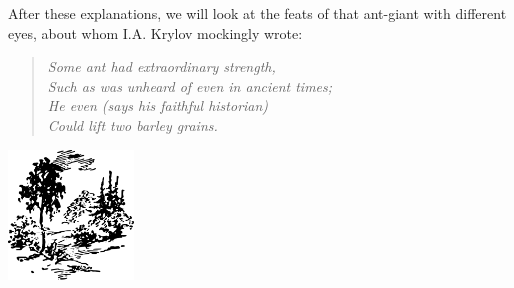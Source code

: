 After these explanations, we will look at the feats of that ant-giant with different eyes, about whom I.A. Krylov mockingly wrote:
\begin{quote}
\emph{Some ant had extraordinary strength,\\
 Such as was unheard of even in ancient times; \\
 He even (says his faithful historian)\\
 Could lift two barley grains.}
\end{quote} 


\begin{center}
\includegraphics[width=0.25\textwidth]{figures/ch-01/fig-ch-01-tail.pdf}
\end{center}


















